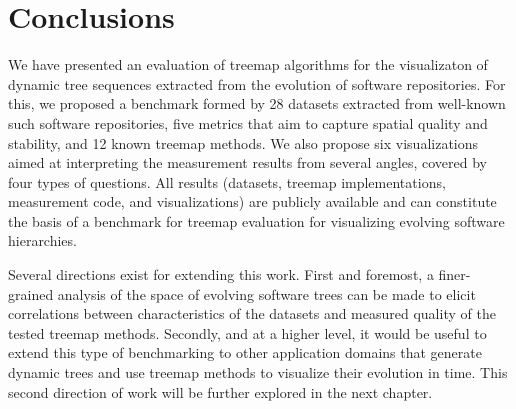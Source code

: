 \section{Conclusions}
\label{sec:conclusions}
%
We have presented an evaluation of treemap algorithms for the visualizaton of dynamic tree sequences extracted from the evolution of software repositories. For this, we proposed a benchmark formed by 28 datasets extracted from well-known such software repositories, five metrics that aim to capture spatial quality and stability, and 12 known treemap methods. We also propose six visualizations aimed at interpreting the measurement results from several angles, covered by four types of questions. All results (datasets, treemap implementations, measurement code, and visualizations) are publicly available and can constitute the basis of a benchmark for treemap evaluation for visualizing evolving software hierarchies. 

Several directions exist for extending this work. First and foremost, a finer-grained analysis of the space of evolving software trees can be made to elicit correlations between characteristics of the datasets and measured quality of the tested treemap methods. Secondly, and at a higher level, it would be useful to extend this type of benchmarking to other application domains that generate dynamic trees and use treemap methods to visualize their evolution in time. This second direction of work will be further explored in the next chapter.

\newpage
